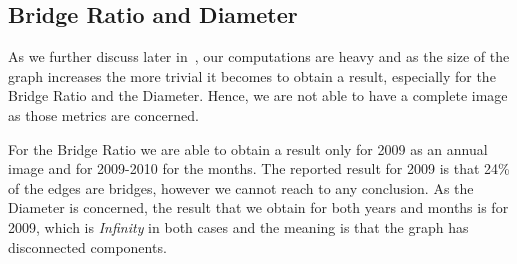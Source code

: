 \subsection{Bridge Ratio and Diameter}
As we further discuss later in~, our computations are
heavy and as the size of the graph increases the more trivial it becomes to
obtain a result, especially for the Bridge Ratio and the Diameter. Hence, we
are not able to have a complete image as those metrics are concerned. 

For the Bridge Ratio we are able to obtain a result only for 2009 as an annual image and for 2009-2010 for the months. The reported result for 2009 is that 24\% of the edges are bridges, however we cannot reach to any conclusion. As the Diameter is concerned, the result that we obtain for both years and months is for 2009, which is \textit{Infinity} in both cases and the meaning is that the graph has disconnected components.


